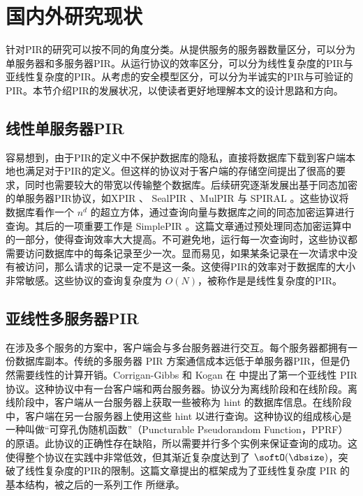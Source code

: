 \section{国内外研究现状}

针对PIR的研究可以按不同的角度分类。从提供服务的服务器数量区分，可以分为单服务器和多服务器PIR。从运行协议的效率区分，可以分为线性复杂度的PIR与亚线性复杂度的PIR。从考虑的安全模型区分，可以分为半诚实的PIR与可验证的PIR。本节介绍PIR的发展状况，以使读者更好地理解本文的设计思路和方向。

\subsection{线性单服务器PIR}
容易想到，由于PIR的定义中不保护数据库的隐私，直接将数据库下载到客户端本地也满足对于PIR的定义。但这样的协议对于客户端的存储空间提出了很高的要求，同时也需要较大的带宽以传输整个数据库。后续研究逐渐发展出基于同态加密的单服务器PIR协议，如XPIR \cite{EPRINT:ABFK14}、 SealPIR \cite{SP:ACLS18}、MulPIR \cite{USENIX:ALPRSSY21} 与 SPIRAL \cite{SP:MenWu22}。这些协议将数据库看作一个 $n^d$ 的超立方体，通过查询向量与数据库之间的同态加密运算进行查询。其后的一项重要工作是 SimplePIR \cite{SimplePIR}。这篇文章通过预处理同态加密运算中的一部分，使得查询效率大大提高。不可避免地，运行每一次查询时，这些协议都需要访问数据库中的每条记录至少一次。显而易见，如果某条记录在一次请求中没有被访问，那么请求的记录一定不是这一条。这使得PIR的效率对于数据库的大小非常敏感。这些协议的查询复杂度为 $O(N)$，被称作是是线性复杂度的PIR。

\subsection{亚线性多服务器PIR}

在涉及多个服务的方案中，客户端会与多台服务器进行交互。每个服务器都拥有一份数据库副本。传统的多服务器 PIR 方案通信成本远低于单服务器PIR，但是仍然需要线性的计算开销。Corrigan-Gibbs 和 Kogan 在 \cite{CK20} 中提出了第一个亚线性 PIR 协议。这种协议中有一台客户端和两台服务器。协议分为离线阶段和在线阶段。离线阶段中，客户端从一台服务器上获取一些被称为 hint 的数据库信息。在线阶段中，客户端在另一台服务器上使用这些 hint 以进行查询。这种协议的组成核心是一种叫做“可穿孔伪随机函数”（Puncturable Pseudorandom Function，PPRF）的原语。此协议的正确性存在缺陷，所以需要并行多个实例来保证查询的成功。这使得整个协议在实践中非常低效，但其渐近复杂度达到了 $\softO(\dbsize)$，突破了线性复杂度的PIR的限制。这篇文章提出的框架成为了亚线性复杂度 PIR 的基本结构，被之后的一系列工作 \cite{Piano,MIR23,CHK22,Checklist,TreePIR} 所继承。

